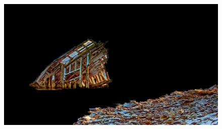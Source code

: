 \documentclass[lang=cn,11pt,a4paper]{elegantpaper}
\begin{document}
\begin{figure}[ht]
\begin{minipage}{0.3\linewidth}
		\centering
		\includegraphics[width=0.95\linewidth]{image/result_boat_.png}
	\end{minipage}%
	

\end{figure}
\end{document}
